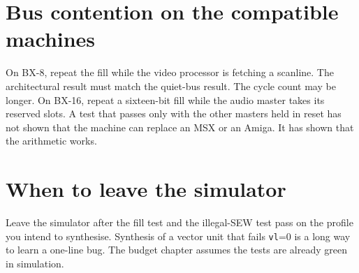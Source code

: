 \section{Bus contention on the compatible machines}

On BX-8, repeat the fill while the video processor is fetching a scanline. The architectural result must match the quiet-bus result. The cycle count may be longer. On BX-16, repeat a sixteen-bit fill while the audio master takes its reserved slots. A test that passes only with the other masters held in reset has not shown that the machine can replace an MSX or an Amiga. It has shown that the arithmetic works.

\section{When to leave the simulator}

Leave the simulator after the fill test and the illegal-SEW test pass on the profile you intend to synthesise. Synthesis of a vector unit that fails \texttt{vl}=0 is a long way to learn a one-line bug. The budget chapter assumes the tests are already green in simulation.
